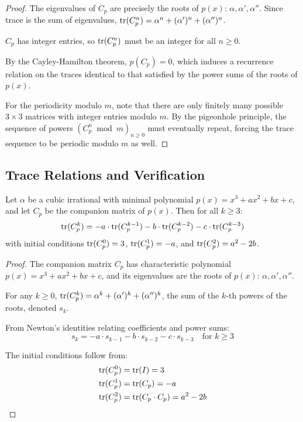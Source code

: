 \begin{proof}
The eigenvalues of $C_p$ are precisely the roots of $p(x)$: $\alpha, \alpha', \alpha''$. Since trace is the sum of eigenvalues, $\operatorname{tr}(C_p^n) = \alpha^n + (\alpha')^n + (\alpha'')^n$.

$C_p$ has integer entries, so $\operatorname{tr}(C_p^n)$ must be an integer for all $n \geq 0$.

By the Cayley-Hamilton theorem, $p(C_p) = 0$, which induces a recurrence relation on the traces identical to that satisfied by the power sums of the roots of $p(x)$.

For the periodicity modulo $m$, note that there are only finitely many possible $3 \times 3$ matrices with integer entries modulo $m$. By the pigeonhole principle, the sequence of powers $(C_p^n \bmod m)_{n \geq 0}$ must eventually repeat, forcing the trace sequence to be periodic modulo $m$ as well.
\end{proof}

\subsection{Trace Relations and Verification}

\begin{theorem}\label{thm:trace_relations}\label{thm:matrix_cubic}
Let $\alpha$ be a cubic irrational with minimal polynomial $p(x) = x^3 + ax^2 + bx + c$, and let $C_p$ be the companion matrix of $p(x)$. Then for all $k \geq 3$:
\begin{equation}
\operatorname{tr}(C_p^k) = -a \cdot \operatorname{tr}(C_p^{k-1}) - b \cdot \operatorname{tr}(C_p^{k-2}) - c \cdot \operatorname{tr}(C_p^{k-3})
\end{equation}
with initial conditions $\operatorname{tr}(C_p^0) = 3$, $\operatorname{tr}(C_p^1) = -a$, and $\operatorname{tr}(C_p^2) = a^2-2b$.
\end{theorem}

\begin{proof}
The companion matrix $C_p$ has characteristic polynomial $p(x) = x^3 + ax^2 + bx + c$, and its eigenvalues are the roots of $p(x)$: $\alpha, \alpha', \alpha''$.

For any $k \geq 0$, $\operatorname{tr}(C_p^k) = \alpha^k + (\alpha')^k + (\alpha'')^k$, the sum of the $k$-th powers of the roots, denoted $s_k$.

From Newton's identities relating coefficients and power sums:
\begin{equation}
s_k = -a \cdot s_{k-1} - b \cdot s_{k-2} - c \cdot s_{k-3} \quad \text{for } k \geq 3
\end{equation}

The initial conditions follow from:
\begin{align}
\operatorname{tr}(C_p^0) &= \operatorname{tr}(I) = 3 \\
\operatorname{tr}(C_p^1) &= \operatorname{tr}(C_p) = -a \\
\operatorname{tr}(C_p^2) &= \operatorname{tr}(C_p \cdot C_p) = a^2-2b
\end{align}
\end{proof}

